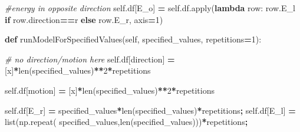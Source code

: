 \documentclass[12pt,twoside]{reedthesis}
\newenvironment{Shaded}{\begin{snugshade}}{\end{snugshade}}
\newcommand{\BuiltInTok}[1]{#1}
\newcommand{\CommentTok}[1]{\textcolor[rgb]{0.56,0.35,0.01}{\textit{#1}}}
\newcommand{\ControlFlowTok}[1]{\textcolor[rgb]{0.13,0.29,0.53}{\textbf{#1}}}
\newcommand{\DecValTok}[1]{\textcolor[rgb]{0.00,0.00,0.81}{#1}}
\newcommand{\KeywordTok}[1]{\textcolor[rgb]{0.13,0.29,0.53}{\textbf{#1}}}
\newcommand{\NormalTok}[1]{#1}
\newcommand{\OperatorTok}[1]{\textcolor[rgb]{0.81,0.36,0.00}{\textbf{#1}}}
\newcommand{\StringTok}[1]{\textcolor[rgb]{0.31,0.60,0.02}{#1}}
\newcommand{\VariableTok}[1]{\textcolor[rgb]{0.00,0.00,0.00}{#1}}
\begin{document}
\begin{Shaded}
\begin{Highlighting}[]
        \CommentTok{\#energy in opposite direction}
        \VariableTok{self}\NormalTok{.df[}\StringTok{\textquotesingle{}E\_o\textquotesingle{}}\NormalTok{] }\OperatorTok{=} \VariableTok{self}\NormalTok{.df.}\BuiltInTok{apply}\NormalTok{(}\KeywordTok{lambda}\NormalTok{ row: }
\NormalTok{               row.E\_l }\ControlFlowTok{if}\NormalTok{ row.direction}\OperatorTok{==}\StringTok{\textquotesingle{}r\textquotesingle{}} 
               \ControlFlowTok{else}\NormalTok{ row.E\_r, }
\NormalTok{               axis}\OperatorTok{=}\DecValTok{1}\NormalTok{)}
        
    \KeywordTok{def}\NormalTok{ runModelForSpecifiedValues(}\VariableTok{self}\NormalTok{, specified\_values, repetitions}\OperatorTok{=}\DecValTok{1}\NormalTok{):}

        \CommentTok{\# no direction/motion here}
        \VariableTok{self}\NormalTok{.df[}\StringTok{\textquotesingle{}direction\textquotesingle{}}\NormalTok{] }\OperatorTok{=} 
\NormalTok{          [}\StringTok{\textquotesingle{}x\textquotesingle{}}\NormalTok{]}\OperatorTok{*}\BuiltInTok{len}\NormalTok{(specified\_values)}\OperatorTok{**}\DecValTok{2}\OperatorTok{*}\NormalTok{repetitions}
          
        \VariableTok{self}\NormalTok{.df[}\StringTok{\textquotesingle{}motion\textquotesingle{}}\NormalTok{] }\OperatorTok{=} 
\NormalTok{          [}\StringTok{\textquotesingle{}x\textquotesingle{}}\NormalTok{]}\OperatorTok{*}\BuiltInTok{len}\NormalTok{(specified\_values)}\OperatorTok{**}\DecValTok{2}\OperatorTok{*}\NormalTok{repetitions}

        \VariableTok{self}\NormalTok{.df[}\StringTok{\textquotesingle{}E\_r\textquotesingle{}}\NormalTok{] }\OperatorTok{=} 
\NormalTok{          specified\_values}\OperatorTok{*}\BuiltInTok{len}\NormalTok{(specified\_values)}\OperatorTok{*}\NormalTok{repetitions}\OperatorTok{;}
        \VariableTok{self}\NormalTok{.df[}\StringTok{\textquotesingle{}E\_l\textquotesingle{}}\NormalTok{] }\OperatorTok{=} \BuiltInTok{list}\NormalTok{(np.repeat(}
\NormalTok{            specified\_values,}\BuiltInTok{len}\NormalTok{(specified\_values)))}\OperatorTok{*}\NormalTok{repetitions}\OperatorTok{;}
        

\end{Highlighting}
\end{Shaded}
\end{document}
